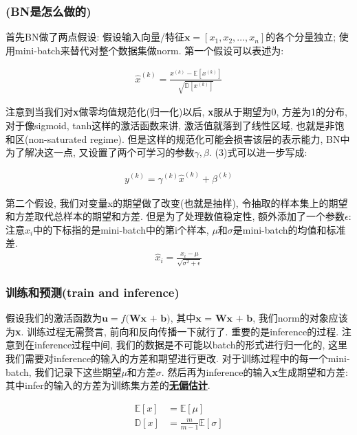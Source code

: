 \documentclass{article}
\begin{document}
\subsubsection{(BN是怎么做的)}

首先BN做了两点假设: 假设输入向量/特征$\textbf{x} = [x_1, x_2, \dots, x_n]$的各个分量独立; 使用mini-batch来替代对整个数据集做norm.
第一个假设可以表述为:

\begin{align}
    \hat{x}^{(k)} = \frac{x^{(k)} - \mathbb{E}[x^{(k)}]}{\sqrt{\mathbb{D}[x^{(k)}]}}
\end{align}

注意到当我们对\textbf{x}做零均值规范化(归一化)以后, \textbf{x}服从于期望为0, 方差为1的分布, 对于像sigmoid, tanh这样的激活函数来讲,
激活值就落到了线性区域, 也就是非饱和区(non-saturated regime). 但是这样的规范化可能会损害该层的表示能力, BN中为了解决这一点,
又设置了两个可学习的参数\textbf{$\gamma, \beta$}. (3)式可以进一步写成:

\begin{align}
    y^{(k)} = \gamma^{(k)} \hat{x}^{(k)} + \beta^{(k)}
\end{align}


第二个假设, 我们对变量x的期望做了改变(也就是抽样), 令抽取的样本集上的期望和方差取代总样本的期望和方差. 但是为了处理数值稳定性, 额外添加了一个参数$\epsilon$:
注意$\hat{x}_i$中的下标指的是mini-batch中的第i个样本, $\mu$和$\sigma$是mini-batch的均值和标准差.
\begin{align}
    \hat{x}_i = \frac{x_i - \mu}{\sqrt{\sigma^2 + \epsilon}}
\end{align}

\subsubsection{训练和预测(train and inference)}

假设我们的激活函数为$\textbf{u} = f\textbf{(Wx + b)}$, 其中$\textbf{x = Wx + b}$, 我们norm的对象应该为\textbf{x}.
训练过程无需赘言, 前向和反向传播一下就行了. 重要的是inference的过程.
注意到在inference过程中间, 我们的数据是不可能以batch的形式进行归一化的, 这里我们需要对inference的输入的方差和期望进行更改.
对于训练过程中的每一个mini-batch, 我们记录下这些期望$\mu$和方差$\sigma$. 然后再为inference的输入\textbf{x}生成期望和方差:
其中infer的输入的方差为训练集方差的\href{https://baike.baidu.com/item/%E6%97%A0%E5%81%8F%E4%BC%B0%E8%AE%A1/3370664?fr=aladdin}{\textbf{无偏估计}}.

\begin{align}
    \mathbb{E}[x] & = \mathbb{E}[\mu]                  \\
    \mathbb{D}[x] & = \tfrac{m}{m-1}\mathbb{E}[\sigma]
\end{align}
\end{document}
